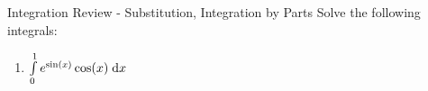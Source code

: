 \documentclass[letterpaper,11pt]{article}
\begin{document}
\begin{section}{Integration Review - Substitution, Integration by Parts}
  Solve the following integrals:
  \begin{enumerate}
    \item $\int \limits_{0}^{1} e^{\sin(x)} \cos(x) \;\mathrm{d}x$
  \end{enumerate}
\end{section}
\end{document}
